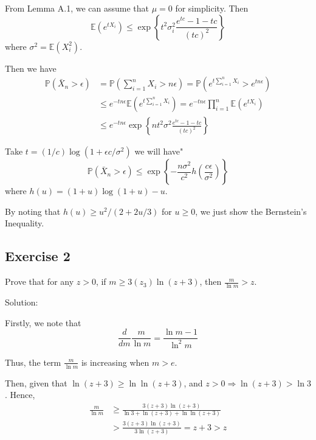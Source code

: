 From Lemma A.1, we can assume that $\mu = 0$ for simplicity. Then
\begin{equation}
    \mathbb{E}\left(e^{t X_{i}}\right) \leq \exp \left\{t^{2} \sigma_{i}^{2} \frac{e^{t c}-1-t c}{(t c)^{2}}\right\}
\end{equation}
where $\sigma^2 = \mathbb{E}(X_{i}^2)$. 

Then we have 
\begin{equation}
    \begin{aligned}
    \mathbb{P}\left(\bar{X}_{n}>\epsilon\right) &=\mathbb{P}\left(\sum_{i=1}^{n} X_{i}>n \epsilon\right)=\mathbb{P}\left(e^{t \sum_{i=1}^{n} X_{i}}>e^{t n \epsilon}\right) \\
    & \leq e^{-t n \epsilon} \mathbb{E}\left(e^{t \sum_{i=1}^{n} X_{i}}\right)=e^{-t n \epsilon} \prod_{i=1}^{n} \mathbb{E}\left(e^{t X_{i}}\right) \\
    & \leq e^{-t n \epsilon} \exp \left\{n t^{2} \sigma^{2} \frac{e^{t c}-1-t c}{(t c)^{2}}\right\}
    \end{aligned}
\end{equation}

Take $t = (1/c) \log (1 + \epsilon c / \sigma^2)$ we will have"
\begin{equation}
    \mathbb{P}\left(\bar{X}_{n}>\epsilon\right) \leq \exp \left\{-\frac{n \sigma^{2}}{c^{2}} h\left(\frac{c \epsilon}{\sigma^{2}}\right)\right\}
\end{equation}
where $h(u) = (1+u) \log(1+u) - u$.

By noting that $h(u) \geq u^2 / (2+2u/3)$ for $u \geq 0$, we just show the Bernstein's Inequality.

\subsection{Exercise 2}
Prove that for any $z > 0$, if $m \geq 3(z_3) \ln (z+3)$, then $\frac{m}{\ln m} >z$. \cite*{Kutin:2002}

Solution:

Firstly, we note that 
\begin{equation}
    \frac{d}{d m} \frac{m}{\ln m}=\frac{\ln m-1}{\ln ^{2} m}
\end{equation}

Thus, the term $\frac{m}{\ln m}$ is increasing when $m > e$.

Then, given that $\ln (z+3) \geq \ln \ln(z+3)$, and $z > 0 \Rightarrow \ln(z+3) > \ln3$. 
Hence, 
\begin{equation}
    \begin{aligned}
    \frac{m}{\ln m} & \geq \frac{3(z+3) \ln (z+3)}{\ln 3+\ln (z+3)+\ln \ln (z+3)} \\
    &>\frac{3(z+3) \ln (z+3)}{3 \ln (z+3)}=z+3>z
    \end{aligned}
\end{equation}
